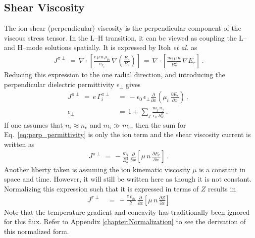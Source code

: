 \subsection{Shear Viscosity}\label{ssec:shear_viscosity}
The ion shear (perpendicular) viscosity is the perpendicular component of the viscous stress tensor.
In the L--H transition, it can be viewed as coupling the L-- and H--mode solutions spatially.
It is expressed by Itoh \emph{et al.} \cite{itoh_elmy_1993} as
\begin{align} %
	J^{\pi\perp} \,=\, \nabla \cdot \left[\frac{e \, \mu \, n \,
		\rho_{\theta i}}{v_{T_i}} \, \nabla\left(\frac{E_r}{B_\theta}\right)
		\right]
		\,=\, \nabla \cdot \left[\frac{m_i \, \mu \, n}{B_\theta^2} \,
		\nabla E_r\right]~. \label{eq:shear_visc_current_definition}
\end{align}
Reducing this expression to the one radial direction, and introducing the perpendicular dielectric permittivity $\epsilon_\perp$ \cite{kiviniemi_numerical_2001} gives
\begin{align} %
	J^{\pi\perp} \,=\, e\,\Gamma_i^{\pi\perp} \,&=\,
		-\epsilon_0\,\epsilon_\perp \frac{\partial}{\partial x}
		\left(\mu_i \, \frac{\partial E_r}{\partial x}\right)~, \\
	\epsilon_\perp \,&=\, 1 + \sum_j \frac{m_j \, n_j}{\epsilon_0 \, B_\theta^2}~.
		\label{eq:perp_permittivity}
\end{align}
If one assumes that $n_i \approx n_e$ and $m_i \gg m_e$, then the sum for Eq.~\ref{eq:perp_permittivity} is only the ion term and the shear viscosity current is written as
\begin{align} %
	J^{\pi\perp} \,=\, -\frac{m_i}{B_\theta^2} \,
		\frac{\partial}{\partial x} \left[\mu \, n \,
		\frac{\partial E_r}{\partial x}\right]~. \label{eq:shear_current_E_r}
\end{align}
Another liberty taken is assuming the ion kinematic viscosity $\mu$ is a constant in space and time.
However, it will still be written here as though it is not constant.
Normalizing this expression such that it is expressed in terms of $Z$ results in
\begin{align} %
	J^{\pi\perp} \,&=\, -\frac{e \, \rho_{\theta i}}{2} \,
		\frac{\partial}{\partial x} \left[\mu \, n \, \frac{\partial Z}
		{\partial x}\right] \label{eq:shear_current_normalized}
\end{align}
Note that the temperature gradient and concavity has traditionally been ignored for this flux.
Refer to Appendix \ref{chapter:Normalization} to see the derivation of this normalized form.


